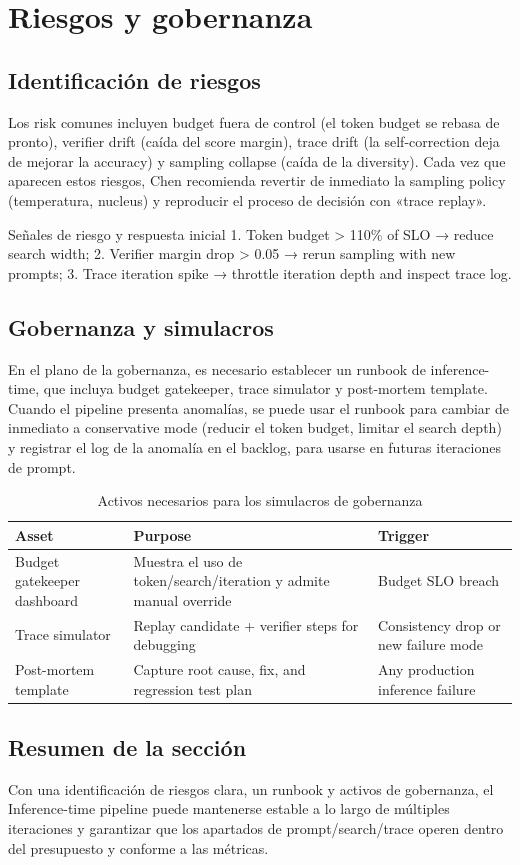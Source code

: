 \section{Riesgos y gobernanza}

\subsection{Identificación de riesgos}
Los risk comunes incluyen budget fuera de control (el token budget se rebasa de pronto), verifier drift (caída del score margin), trace drift (la self-correction deja de mejorar la accuracy) y sampling collapse (caída de la diversity). Cada vez que aparecen estos riesgos, Chen recomienda revertir de inmediato la sampling policy (temperatura, nucleus) y reproducir el proceso de decisión con «trace replay».

\begin{warningbox}{Señales de riesgo y respuesta inicial}
1. Token budget > 110\% of SLO → reduce search width; 2. Verifier margin drop > 0.05 → rerun sampling with new prompts; 3. Trace iteration spike → throttle iteration depth and inspect trace log.
\end{warningbox}

\subsection{Gobernanza y simulacros}
En el plano de la gobernanza, es necesario establecer un runbook de inference-time, que incluya budget gatekeeper, trace simulator y post-mortem template. Cuando el pipeline presenta anomalías, se puede usar el runbook para cambiar de inmediato a conservative mode (reducir el token budget, limitar el search depth) y registrar el log de la anomalía en el backlog, para usarse en futuras iteraciones de prompt.

\begin{table}[H]
\centering
\caption{Activos necesarios para los simulacros de gobernanza}
\begin{tabular}{p{}p{}p{}}
\toprule
Asset & Purpose & Trigger \\
\midrule
Budget gatekeeper dashboard & Muestra el uso de token/search/iteration y admite manual override & Budget SLO breach \\
Trace simulator & Replay candidate + verifier steps for debugging & Consistency drop or new failure mode \\
Post-mortem template & Capture root cause, fix, and regression test plan & Any production inference failure \\
\bottomrule
\end{tabular}
\end{table}

\subsection{Resumen de la sección}
Con una identificación de riesgos clara, un runbook y activos de gobernanza, el Inference-time pipeline puede mantenerse estable a lo largo de múltiples iteraciones y garantizar que los apartados de prompt/search/trace operen dentro del presupuesto y conforme a las métricas.
